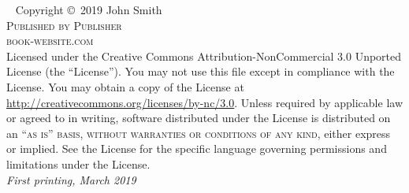 \documentclass[11pt,fleqn]{book}
\begin{document}
\begingroup
\thispagestyle{empty} %
\vfill
\endgroup
\newpage
~\vfill
\thispagestyle{empty}
\noindent Copyright \copyright\ 2019 John Smith\\ %
\noindent \textsc{Published by Publisher}\\ %
\noindent \textsc{book-website.com}\\ %
\noindent Licensed under the Creative Commons Attribution-NonCommercial 3.0 Unported License (the ``License''). You may not use this file except in compliance with the License. You may obtain a copy of the License at \url{http://creativecommons.org/licenses/by-nc/3.0}. Unless required by applicable law or agreed to in writing, software distributed under the License is distributed on an \textsc{``as is'' basis, without warranties or conditions of any kind}, either express or implied. See the License for the specific language governing permissions and limitations under the License.\\ 
\noindent \textit{First printing, March 2019} %
{} %
\pagestyle{empty} %
\tableofcontents %
\cleardoublepage %
\pagestyle{fancy} %
\end{document}
